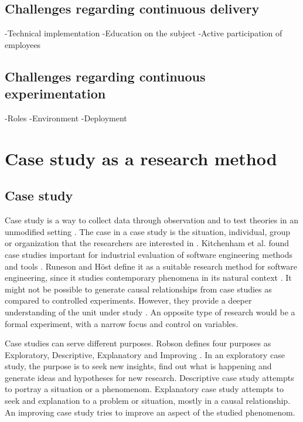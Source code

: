 \documentclass[english]{tktltiki2}
\theoremstyle{definition}
\theoremstyle{remark}
\begin{document}
\subsection{Challenges regarding continuous delivery}
-Technical implementation
-Education on the subject
-Active participation of employees

\subsection{Challenges regarding continuous experimentation}
-Roles
-Environment
-Deployment

\section{Case study as a research method}

\subsection{Case study}
Case study is a way to collect data through observation and to test theories in an unmodified setting \cite{zelkowitz1998experimental}. The case in a case study is the situation, individual, group or organization that the researchers are interested in \cite{robson2002real}. Kitchenham et al. found case studies important for industrial evaluation of software engineering methods and tools \cite{kitchenham1995case}. Runeson and Höst define it as a suitable research method for software engineering, since it studies contemporary phenomena in its natural context \cite{runeson2009guidelines}. It might not be possible to generate causal relationships from case studies as compared to controlled experiments. However, they provide a deeper understanding of the unit under study \cite{runeson2009guidelines}. An opposite type of research would be a formal experiment, with a narrow focus and control on variables. 

Case studies can serve different purposes. Robson defines four purposes as Exploratory, Descriptive, Explanatory and Improving \cite{robson2002real}. In an exploratory case study, the purpose is to seek new insights, find out what is happening and generate ideas and hypotheses for new research. Descriptive case study attempts to portray a situation or a phenomenom. Explanatory case study attempts to seek and explanation to a problem or situation, mostly in a causal relationship. An improving case study tries to improve an aspect of the studied phenomenom.  
\end{document}
